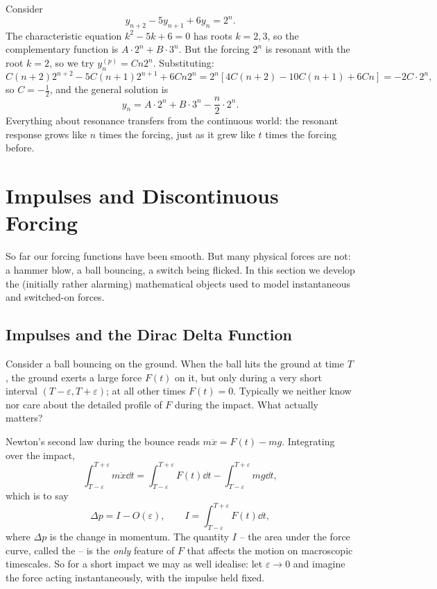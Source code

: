 \documentclass[a4paper]{scrartcl}
\begin{document}
\begin{example}
	Consider
	$$
	y_{n + 2} - 5 y_{n + 1} + 6 y_n = 2^n.
	$$
	The characteristic equation $k^2 - 5k + 6 = 0$ has roots $k = 2, 3$, so the complementary function is $A \cdot 2^n + B \cdot 3^n$. But the forcing $2^n$ is resonant with the root $k = 2$, so we try $y_n^{(p)} = C n 2^n$. Substituting:
	$$
	C(n + 2)2^{n + 2} - 5C(n+1)2^{n + 1} + 6Cn2^n = 2^n \left[4C(n + 2) - 10C(n + 1) + 6Cn\right] = -2C \cdot 2^n,
	$$
	so $C = -\frac12$, and the general solution is
	$$
	y_n = A \cdot 2^n + B \cdot 3^n - \frac{n}{2} \cdot 2^n.
	$$
	Everything about resonance transfers from the continuous world: the resonant response grows like $n$ times the forcing, just as it grew like $t$ times the forcing before.
\end{example}

\section{Impulses and Discontinuous Forcing}

So far our forcing functions have been smooth. But many physical forces are not: a hammer blow, a ball bouncing, a switch being flicked. In this section we develop the (initially rather alarming) mathematical objects used to model instantaneous and switched-on forces.

\subsection{Impulses and the Dirac Delta Function}

Consider a ball bouncing on the ground. When the ball hits the ground at time $T$, the ground exerts a large force $F(t)$ on it, but only during a very short interval $(T - \varepsilon, T + \varepsilon)$; at all other times $F(t) = 0$. Typically we neither know nor care about the detailed profile of $F$ during the impact. What actually matters?

Newton's second law during the bounce reads $m \ddot x = F(t) - mg$. Integrating over the impact,
$$
\int_{T - \varepsilon}^{T + \varepsilon} m \ddot x \dd t = \int_{T - \varepsilon}^{T + \varepsilon} F(t) \dd t - \int_{T - \varepsilon}^{T + \varepsilon} mg \dd t,
$$
which is to say
$$
\Delta p = I - O(\varepsilon), \qquad I = \int_{T - \varepsilon}^{T + \varepsilon} F(t) \dd t,
$$
where $\Delta p$ is the change in momentum. The quantity $I$ -- the area under the force curve, called the  -- is the \emph{only} feature of $F$ that affects the motion on macroscopic timescales. So for a short impact we may as well idealise: let $\varepsilon \to 0$ and imagine the force acting instantaneously, with the impulse held fixed.
\end{document}
